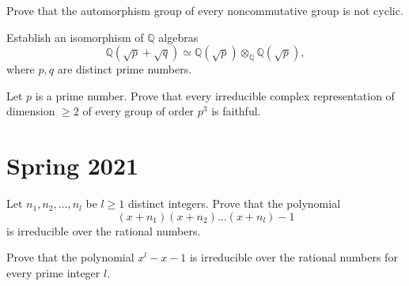 \documentclass[openany]{book}
\begin{document}
\begin{prob}
    Prove that the automorphism group of every noncommutative group is not cyclic.
\end{prob}


\begin{prob}
    Establish an isomorphism of \(\mathbb{Q}\) algebras 
    \[\mathbb{Q}(\sqrt{p} + \sqrt{q}) \simeq \mathbb{Q}(\sqrt{p}) \otimes_{\mathbb{Q}} \mathbb{Q}(\sqrt{p}),\] 
    where \(p, q\) are distinct prime numbers.
\end{prob}


\begin{prob}
    Let \(p\) is a prime number. Prove that every irreducible complex representation of dimension \(\geq 2\) of every group of order \(p^3\) is faithful.
\end{prob}




\chapter{Spring 2021}


\begin{prob}
    Let \(n_{1}, n_{2}, \ldots, n_{l}\) be \(l \geq 1\) distinct integers. Prove that the polynomial 
    \[(x + n_{1})(x + n_{2}) \ldots (x + n_{l}) - 1\] 
    is irreducible over the rational numbers.
\end{prob}


\begin{prob}
    Prove that the polynomial \(x^{l} - x - 1\) is irreducible over the rational numbers for every prime integer \(l\).
\end{prob}
\end{document}
